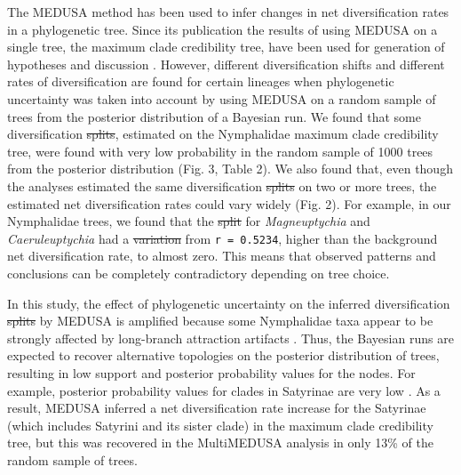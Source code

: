 \documentclass[10pt,letterpaper]{article} %
\providecommand{\DIFadd}[1]{{\protect\color{blue}\uwave{#1}}} %
\providecommand{\DIFdel}[1]{{\protect\color{red}\sout{#1}}}                      %
\providecommand{\DIFaddbegin}{} %
\providecommand{\DIFaddend}{} %
\providecommand{\DIFdelbegin}{} %
\providecommand{\DIFdelend}{} %
\begin{document}
The MEDUSA method has been used to infer changes in net diversification
rates in a phylogenetic tree. Since its publication \cite{alfaro2009} the results
of using MEDUSA on a single tree, the maximum clade credibility tree,
have been used for generation of hypotheses and discussion
\cite{heikkila2012, litman2011, ryberg2012}. However, different diversification
shifts and different
rates of diversification are found for certain lineages when
phylogenetic uncertainty was taken into account by using MEDUSA on a
random sample of trees from the posterior distribution of a Bayesian
run. We found that some diversification \DIFdelbegin \DIFdel{splits}\DIFdelend \DIFaddbegin \DIFadd{shifts}\DIFaddend , estimated on the
Nymphalidae maximum clade credibility tree, were found with very low
probability in the random sample of 1000 trees from the posterior
distribution (Fig. 3, Table 2). We also found that, even though the
analyses estimated the same diversification \DIFdelbegin \DIFdel{splits }\DIFdelend \DIFaddbegin \DIFadd{shifts }\DIFaddend on two or more trees,
the estimated net diversification rates could vary widely (Fig. 2). For
example, in our Nymphalidae trees, we found that the \DIFdelbegin \DIFdel{split }\DIFdelend \DIFaddbegin \DIFadd{shift }\DIFaddend for
\emph{Magneuptychia} and \emph{Caeruleuptychia} had a \DIFdelbegin \DIFdel{variation }\DIFdelend \DIFaddbegin \DIFadd{rate }\DIFaddend from
\texttt{r = 0.5234}, higher than the background net diversification
rate, to almost zero. This means that observed patterns and conclusions
can be completely contradictory depending on tree choice.

In this study, the effect of phylogenetic uncertainty on the inferred
diversification \DIFdelbegin \DIFdel{splits }\DIFdelend \DIFaddbegin \DIFadd{shifts }\DIFaddend by MEDUSA is amplified because some Nymphalidae
taxa appear to be strongly affected by long-branch attraction artifacts
\cite{pena2011}. Thus, the Bayesian runs are expected to recover alternative
topologies on the posterior distribution of trees, resulting in low
support and posterior probability values for the nodes. For example,
posterior probability values for clades in Satyrinae are very low
\cite{wahlberg2009}. As a result, MEDUSA inferred a net diversification rate
increase for the Satyrinae (which includes Satyrini and its sister
clade) in the maximum clade credibility tree, but this was recovered in
the MultiMEDUSA analysis in only 13\% of the random sample of trees.
\end{document}
